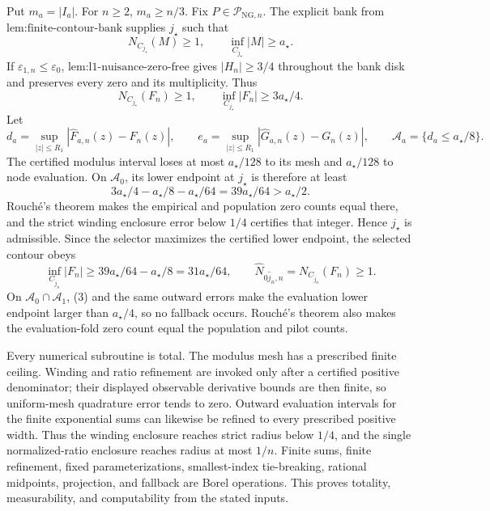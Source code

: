 Put \(m_a=|I_a|\).  For \(n\ge2\), \(m_a\ge n/3\).  Fix \(P\in\mathcal P_{\mathrm{NG},n}\).  The explicit bank from \(\text{lem:finite-contour-bank}\) supplies \(j_{\star}\) such that
\[
 N_{C_{j_{\star}}}(M)\ge1,
 \qquad \inf_{C_{j_{\star}}}|M|\ge a_{\star}.
\]
If \(\varepsilon_{1,n}\le\varepsilon_0\), \(\text{lem:l1-nuisance-zero-free}\) gives \(|H_n|\ge3/4\) throughout the bank disk and preserves every zero and its multiplicity.  Thus
\[
 N_{C_{j_{\star}}}(F_n)\ge1,
 \qquad \inf_{C_{j_{\star}}}|F_n|\ge3a_{\star}/4. \tag{1}
\]
Let
\[
 d_a=\sup_{|z|\le R_1}|\widehat F_{a,n}(z)-F_n(z)|,
 \qquad
 e_a=\sup_{|z|\le R_1}|\widehat G_{a,n}(z)-G_n(z)|,
 \qquad
 \mathcal A_a=\{d_a\le a_{\star}/8\}.
\]
The certified modulus interval loses at most \(a_{\star}/128\) to its mesh and \(a_{\star}/128\) to node evaluation.  On \(\mathcal A_0\), its lower endpoint at \(j_{\star}\) is therefore at least
\[
 3a_{\star}/4-a_{\star}/8-a_{\star}/64
 =39a_{\star}/64>a_{\star}/2. \tag{2}
\]
Rouch\'e's theorem makes the empirical and population zero counts equal there, and the strict winding enclosure error below \(1/4\) certifies that integer.  Hence \(j_{\star}\) is admissible.  Since the selector maximizes the certified lower endpoint, the selected contour obeys
\[
 \inf_{C_{\widehat j_n}}|F_n|
 \ge39a_{\star}/64-a_{\star}/8
 =31a_{\star}/64,
 \qquad
 \widehat N_{0\widehat j_n,n}=N_{C_{\widehat j_n}}(F_n)\ge1. \tag{3}
\]
On \(\mathcal A_0\cap\mathcal A_1\), (3) and the same outward errors make the evaluation lower endpoint larger than \(a_{\star}/4\), so no fallback occurs.  Rouch\'e's theorem also makes the evaluation-fold zero count equal the population and pilot counts.

Every numerical subroutine is total.  The modulus mesh has a prescribed finite ceiling.  Winding and ratio refinement are invoked only after a certified positive denominator; their displayed observable derivative bounds are then finite, so uniform-mesh quadrature error tends to zero.  Outward evaluation intervals for the finite exponential sums can likewise be refined to every prescribed positive width.  Thus the winding enclosure reaches strict radius below \(1/4\), and the single normalized-ratio enclosure reaches radius at most \(1/n\).  Finite sums, finite refinement, fixed parameterizations, smallest-index tie-breaking, rational midpoints, projection, and fallback are Borel operations.  This proves totality, measurability, and computability from the stated inputs.

